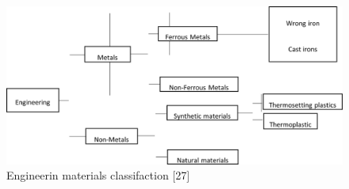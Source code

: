 \documentclass[12pt]{report}
\begin{document}
\begin{figure}[H]
    \centering
    \includegraphics[width=\textwidth]{materials_classification.png}
    \caption{Engineerin materials classifaction [27]}
    \label{ch3:figure:materials}
\end{figure}
\end{document}
